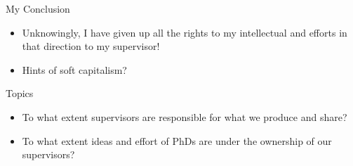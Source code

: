\documentclass[aspectratio=169]{beamer}
\begin{document}
\begin{frame}{My Conclusion}
  \begin{itemize}
    \item Unknowingly, I have given up all the rights to my intellectual and efforts in that direction to my supervisor!
    \item Hints of soft capitalism?
  \end{itemize}
\end{frame}

\begin{frame}{Topics}
  \begin{itemize}
    \item To what extent supervisors are responsible for what we produce and share?
    \item To what extent ideas and effort of PhDs are under the ownership of our supervisors?
  \end{itemize}
\end{frame}
\end{document}
